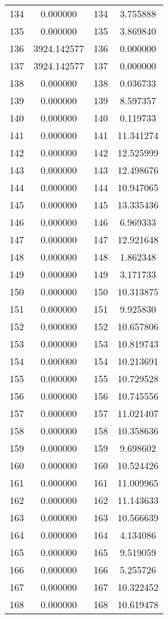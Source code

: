 \documentclass[12pt]{article}
\begin{document}
\begin{longtable}{@{}cccc@{}}
134 & 0.000000 & 134 & 3.755888 \\
135 & 0.000000 & 135 & 3.869840 \\
136 & 3924.142577 & 136 & 0.000000 \\
137 & 3924.142577 & 137 & 0.000000 \\
138 & 0.000000 & 138 & 0.036733 \\
139 & 0.000000 & 139 & 8.597357 \\
140 & 0.000000 & 140 & 0.119733 \\
141 & 0.000000 & 141 & 11.341274 \\
142 & 0.000000 & 142 & 12.525999 \\
143 & 0.000000 & 143 & 12.498676 \\
144 & 0.000000 & 144 & 10.947065 \\
145 & 0.000000 & 145 & 13.335436 \\
146 & 0.000000 & 146 & 6.969333 \\
147 & 0.000000 & 147 & 12.921648 \\
148 & 0.000000 & 148 & 1.862348 \\
149 & 0.000000 & 149 & 3.171733 \\
150 & 0.000000 & 150 & 10.313875 \\
151 & 0.000000 & 151 & 9.925830 \\
152 & 0.000000 & 152 & 10.657806 \\
153 & 0.000000 & 153 & 10.819743 \\
154 & 0.000000 & 154 & 10.213691 \\
155 & 0.000000 & 155 & 10.729528 \\
156 & 0.000000 & 156 & 10.745556 \\
157 & 0.000000 & 157 & 11.021407 \\
158 & 0.000000 & 158 & 10.358636 \\
159 & 0.000000 & 159 & 9.698602 \\
160 & 0.000000 & 160 & 10.524426 \\
161 & 0.000000 & 161 & 11.009965 \\
162 & 0.000000 & 162 & 11.143633 \\
163 & 0.000000 & 163 & 10.566639 \\
164 & 0.000000 & 164 & 4.134086 \\
165 & 0.000000 & 165 & 9.519059 \\
166 & 0.000000 & 166 & 5.255726 \\
167 & 0.000000 & 167 & 10.322452 \\
168 & 0.000000 & 168 & 10.619478 \\

\end{longtable}
\end{document}
